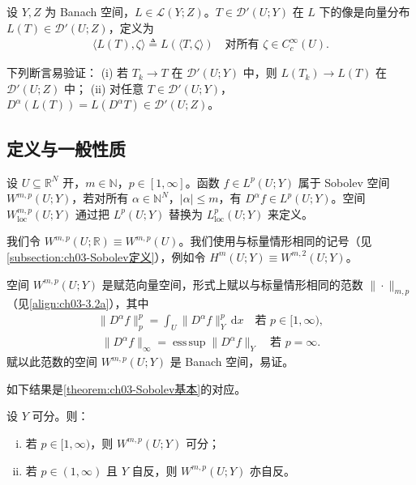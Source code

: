 \documentclass[../../main.tex]{subfiles}%
\begin{document}
\begin{definition}\label{definition:ch04-分布像}
设 $Y,Z$ 为 Banach 空间，$L\in\mathcal{L}(Y;Z)$。$T\in\mathcal{D}'(U;Y)$ 在 $L$ 下的像是向量分布 $L(T)\in\mathcal{D}'(U;Z)$，定义为
\begin{align*}
\langle L(T),\zeta\rangle\triangleq L(\langle T,\zeta\rangle)\quad\text{对所有 }\zeta\in C_c^\infty(U).
\end{align*}
\end{definition}

\begin{remark}\label{remark:ch04-分布像性质}
下列断言易验证：
(i) 若 $T_k\to T$ 在 $\mathcal{D}'(U;Y)$ 中，则 $L(T_k)\to L(T)$ 在 $\mathcal{D}'(U;Z)$ 中；
(ii) 对任意 $T\in\mathcal{D}'(U;Y)$，$D^\alpha(L(T))=L(D^\alpha T)\in\mathcal{D}'(U;Z)$。
\end{remark}

\subsection{定义与一般性质}\label{subsection:ch04-向量Sobolev定义}

\begin{definition}\label{definition:ch04-向量Sobolev}
设 $U\subseteq\mathbb{R}^N$ 开，$m\in\mathbb{N}$，$p\in[1,\infty]$。函数 $f\in L^p(U;Y)$ 属于 Sobolev 空间 $W^{m,p}(U;Y)$，若对所有 $\alpha\in\mathbb{N}^N$，$|\alpha|\leqslant m$，有 $D^\alpha f\in L^p(U;Y)$。空间 $W^{m,p}_{\mathrm{loc}}(U;Y)$ 通过把 $L^p(U;Y)$ 替换为 $L^p_{\mathrm{loc}}(U;Y)$ 来定义。
\end{definition}

我们令 $W^{m,p}(U;\mathbb{R})\equiv W^{m,p}(U)$。我们使用与标量情形相同的记号（见\cref{subsection:ch03-Sobolev定义}），例如令 $H^m(U;Y)\equiv W^{m,2}(U;Y)$。

空间 $W^{m,p}(U;Y)$ 是赋范向量空间，形式上赋以与标量情形相同的范数 $\|\cdot\|_{m,p}$（见\eqref{align:ch03-3.2a}），其中
\begin{align*}
\|D^\alpha f\|_p^p=\int_U\|D^\alpha f\|_Y^p\,\mathrm{d}x\quad\text{若 }p\in[1,\infty),
\end{align*}
\begin{align*}
\|D^\alpha f\|_\infty=\operatorname*{ess\,sup}\|D^\alpha f\|_Y\quad\text{若 }p=\infty.
\end{align*}
赋以此范数的空间 $W^{m,p}(U;Y)$ 是 Banach 空间，易证。

如下结果是\cref{theorem:ch03-Sobolev基本}的对应。

\begin{theorem}\label{theorem:ch04-Sobolev可分自反}
设 $Y$ 可分。则：
\begin{enumerate}[(i)]
\item\label{item:ch04-Sobolev可分自反-i} 若 $p\in[1,\infty)$，则 $W^{m,p}(U;Y)$ 可分；
\item\label{item:ch04-Sobolev可分自反-ii} 若 $p\in(1,\infty)$ 且 $Y$ 自反，则 $W^{m,p}(U;Y)$ 亦自反。
\end{enumerate}
\end{theorem}
\end{document}
